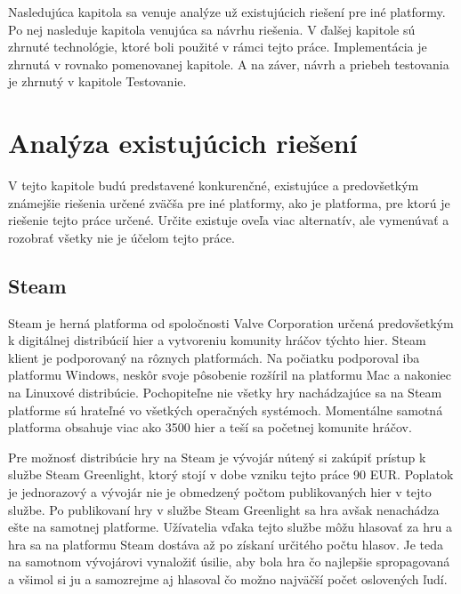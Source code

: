 Nasledujúca kapitola sa venuje analýze už existujúcich riešení pre iné platformy. Po nej nasleduje kapitola venujúca sa návrhu riešenia. V ďalšej kapitole sú zhrnuté technológie, ktoré boli použité v rámci tejto práce. Implementácia je zhrnutá v rovnako pomenovanej kapitole. A na záver, návrh a priebeh testovania je zhrnutý v kapitole Testovanie.

\chapter{Analýza existujúcich riešení}
\label{chap:analyza}
V tejto kapitole budú predstavené konkurenčné, existujúce a predovšetkým známejšie riešenia určené zväčša pre iné platformy, ako je platforma, pre ktorú je riešenie tejto práce určené. Určite existuje oveľa viac alternatív, ale vymenúvať a rozobrať všetky nie je účelom tejto práce.

\section{Steam}
Steam je herná platforma od spoločnosti Valve Corporation určená predovšetkým k digitálnej distribúcií hier a vytvoreniu komunity hráčov týchto hier. Steam klient je podporovaný na rôznych platformách. Na počiatku podporoval iba platformu Windows, neskôr svoje pôsobenie rozšíril na platformu Mac a nakoniec na Linuxové distribúcie. Pochopiteľne nie všetky hry nachádzajúce sa na Steam platforme sú hrateľné vo všetkých operačných systémoch. Momentálne samotná platforma obsahuje viac ako 3500 hier a teší sa početnej komunite hráčov. \cite{steam}

Pre možnosť distribúcie hry na Steam je vývojár nútený si zakúpiť prístup k službe Steam Greenlight, ktorý stojí v dobe vzniku tejto práce 90 EUR. Poplatok je jednorazový a vývojár nie je obmedzený počtom publikovaných hier v tejto službe. Po publikovaní hry v službe Steam Greenlight sa hra avšak nenachádza ešte na samotnej platforme. Užívatelia vďaka tejto službe môžu hlasovať za hru a hra sa na platformu Steam dostáva až po získaní určitého počtu hlasov. Je teda na samotnom vývojárovi vynaložiť úsilie, aby bola hra čo najlepšie spropagovaná a všimol si ju a samozrejme aj hlasoval čo možno najväčší počet oslovených ľudí. \cite{steam-greenlight}

